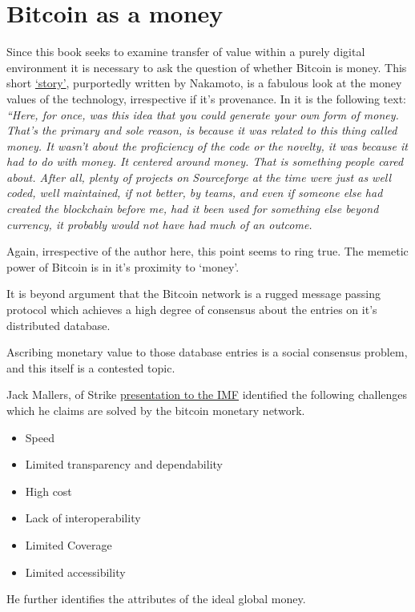 \section{Bitcoin as a money}
Since this book seeks to examine transfer of value within a purely digital environment it is necessary to ask the question of whether Bitcoin is money. This short \href{https://bitcoin-zar.blogspot.com/2018/07/duality-excerpt-by-satoshi-nakomoto.html}{`story'}, purportedly written by Nakamoto, is a fabulous look at the money values of the technology, irrespective if it's provenance. In it is the following text: \textit{``Here, for once, was this idea that you could generate your own form of money. That's the primary and sole reason, is because it was related to this thing called money. It wasn't about the proficiency of the code or the novelty, it was because it had to do with money. It centered around money. That is something people cared about. After all, plenty of projects on Sourceforge at the time were just as well coded, well maintained, if not better, by teams, and even if someone else had created the blockchain before me, had it been used for something else beyond currency, it probably would not have had much of an outcome.}\par
Again, irrespective of the author here, this point seems to ring true. The memetic power of Bitcoin is in it's proximity to `money'.\par
It is beyond argument that the Bitcoin network is a rugged message passing protocol which achieves a high degree of consensus about the entries on it's distributed database.\par Ascribing monetary value to those database entries is a social consensus problem, and this itself is a contested topic. \par
Jack Mallers, of Strike \href{https://www.youtube.com/watch?v=jb-45m9f76I}{presentation to the IMF} identified the following challenges which he claims are solved by the bitcoin monetary network.
\begin{itemize}
\item Speed
\item Limited transparency and dependability
\item High cost
\item Lack of interoperability
\item Limited Coverage
\item Limited accessibility
\end{itemize}
He further identifies the attributes of the ideal global money. 

